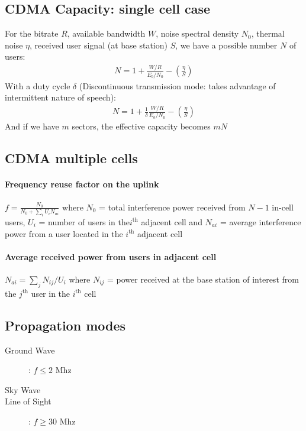 \documentclass[10pt, a4paper,twocolumn]{scrartcl}
\begin{document}
\subsection{CDMA Capacity: single cell case}
For the bitrate $R$, available bandwidth $W$, noise spectral density $N_0$, thermal noise $\eta$, received user signal (at base station) $S$, we have a possible number $N$ of users:
\begin{align*}
	N = 1 + \frac{W/R}{E_b/N_0} - (\frac{\eta}{S})
\end{align*}
With a duty cycle $\delta$ (Discontinuous transmission mode: takes advantage of
intermittent nature of speech):
\begin{align*}
	N = 1 + \frac1\delta\frac{W/R}{E_b/N_0} - (\frac{\eta}{S})
\end{align*}
And if we have $m$ sectors, the effective capacity becomes $mN$
\subsection{CDMA multiple cells}
\paragraph{Frequency reuse factor on the uplink} 
$f = \frac{N_0}{N_0 + \sum_iU_iN_{ai}}$ where $N_0$ = total interference power received from $N-1$ in-cell users, $U_i$ = number of users in the$i^\text{th}$ adjacent cell and $N_{ai}$ = average interference power from a user located in the $i^\text{th}$ adjacent cell

\paragraph{Average received power from users in adjacent cell}
$N_{ai} = \sum_j N_{ij}/U_i$ where $N_{ij}$ = power received at the base station of interest from the $j^\text{th}$ user in the $i^\text{th}$ cell

\subsection{Propagation modes}
\begin{multicols}{2}
	\begin{description}
		\item[Ground Wave] : $f \le 2$ Mhz
		\item[Sky Wave]
		\item[Line of Sight] : $f \ge 30$ Mhz
	\end{description}
\end{multicols}
\end{document}
